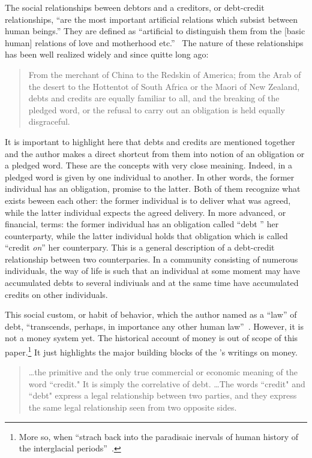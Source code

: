 The social relationships beween debtors and a creditors, or debt-credit relationships, ``are the most important artificial relations which subsist between human beings.'' They are defined as ``artificial to distinguish them from the [basic human] relations of love and motherhood etc.''~\citep[p.~16]{innes1909} The nature of these relationships has been well realized widely and since quitte long ago:

\begin{quote}
From the merchant of China to the Redskin of America; from the Arab of the desert to the Hottentot of South Africa or the Maori of New Zealand, debts and credits are equally familiar to all, and the breaking of the pledged word, or the refusal to carry out an obligation is held equally disgraceful.~\citep[p.~391]{innes1913}
\end{quote}

It is important to highlight here that debts and credits are mentioned together and the author makes a direct shortcut from them into notion of an obligation or a pledged word. These are the concepts with very close meaining. Indeed, in a pledged word is given by one individual to another. In other words, the former individual has an obligation, promise to the latter. Both of them recognize what exists beween each other: the former individual is to deliver what was agreed, while the latter individual expects the  agreed delivery. In more advanced, or financial, terms: the former individual has an obligation called ``debt '' her counterparty, while the latter individual holds that obligation which is called ``credit \textit{on}'' her counterpary. This is a general description of a debt-credit relationship between two counterparies. In a community consisting of numerous individuals, the way of life is such that an individual at some moment may have accumulated debts to several indiviuals and at the same time have accumulated credits on other individuals.

This social custom, or habit of behavior, which the author named as a ``law'' of debt, ``transcends, perhaps, in importance any other human law''~\citep[p.~16]{innes1909}. However, it is not a money system yet. The historical account of money is out of scope of this paper.\footnote{More so, when ``strach back into the paradisaic inervals of human history of the interglacial periods''~\citep[p.~13]{keynes1930a}.} It just highlights the major building blocks of the \citeauthor{innes1913}'s writings on money. 


\begin{quote}\dots the primitive and the only true commercial or economic meaning of the word ``credit." It is simply the correlative of debt. \dots The words ``credit" and ``debt" express a legal relationship between two parties, and they express the same legal relationship seen from two opposite sides. \citep[p.~392]{innes1913}
\end{quote}

